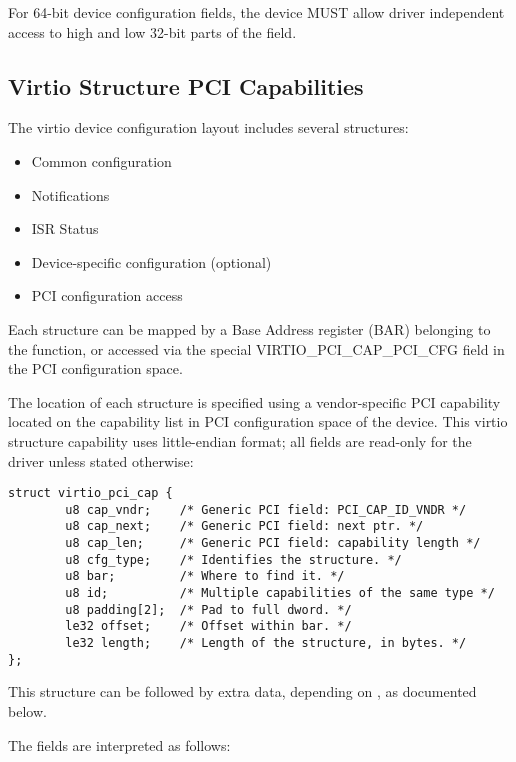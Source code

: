 For 64-bit device configuration fields, the device MUST allow driver
independent access to high and low 32-bit parts of the field.

\subsection{Virtio Structure PCI Capabilities}\label{sec:Virtio Transport Options / Virtio Over PCI Bus / Virtio Structure PCI Capabilities}

The virtio device configuration layout includes several structures:
\begin{itemize}
\item Common configuration
\item Notifications
\item ISR Status
\item Device-specific configuration (optional)
\item PCI configuration access
\end{itemize}

Each structure can be mapped by a Base Address register (BAR) belonging to
the function, or accessed via the special VIRTIO_PCI_CAP_PCI_CFG field in the PCI configuration space.

The location of each structure is specified using a vendor-specific PCI capability located
on the capability list in PCI configuration space of the device.
This virtio structure capability uses little-endian format; all fields are
read-only for the driver unless stated otherwise:

\begin{lstlisting}
struct virtio_pci_cap {
        u8 cap_vndr;    /* Generic PCI field: PCI_CAP_ID_VNDR */
        u8 cap_next;    /* Generic PCI field: next ptr. */
        u8 cap_len;     /* Generic PCI field: capability length */
        u8 cfg_type;    /* Identifies the structure. */
        u8 bar;         /* Where to find it. */
        u8 id;          /* Multiple capabilities of the same type */
        u8 padding[2];  /* Pad to full dword. */
        le32 offset;    /* Offset within bar. */
        le32 length;    /* Length of the structure, in bytes. */
};
\end{lstlisting}

This structure can be followed by extra data, depending on
, as documented below.

The fields are interpreted as follows:

